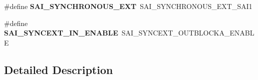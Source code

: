 \begin{DoxyCompactItemize}
\item 
\mbox{\label{group___h_a_l___s_a_i___aliased___macros_ga14be5593f2f4de9699b49f5e307e98fe}} 
\#define {\bfseries S\+A\+I\+\_\+\+S\+Y\+N\+C\+H\+R\+O\+N\+O\+U\+S\+\_\+\+E\+XT}~S\+A\+I\+\_\+\+S\+Y\+N\+C\+H\+R\+O\+N\+O\+U\+S\+\_\+\+E\+X\+T\+\_\+\+S\+A\+I1
\item 
\mbox{\label{group___h_a_l___s_a_i___aliased___macros_ga05572ce0b163fe7bd2269692929f84af}} 
\#define {\bfseries S\+A\+I\+\_\+\+S\+Y\+N\+C\+E\+X\+T\+\_\+\+I\+N\+\_\+\+E\+N\+A\+B\+LE}~S\+A\+I\+\_\+\+S\+Y\+N\+C\+E\+X\+T\+\_\+\+O\+U\+T\+B\+L\+O\+C\+K\+A\+\_\+\+E\+N\+A\+B\+LE
\end{DoxyCompactItemize}


\subsection{Detailed Description}
